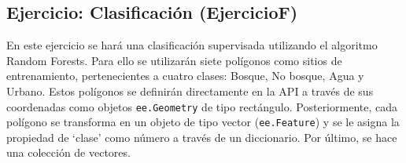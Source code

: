 \documentclass[
  12pt,
  letterpaper,
  twoside]{book}
\begin{document}
\hypertarget{ejercicio-clasificaciuxf3n-ejerciciof}{%
\subsection{Ejercicio: Clasificación (EjercicioF)}\label{ejercicio-clasificaciuxf3n-ejerciciof}}

En este ejercicio se hará una clasificación supervisada utilizando el algoritmo Random Forests. Para ello se utilizarán siete polígonos como sitios de entrenamiento, pertenecientes a cuatro clases: Bosque, No bosque, Agua y Urbano. Estos polígonos se definirán directamente en la API a través de sus coordenadas como objetos \texttt{ee.Geometry} de tipo rectángulo. Posteriormente, cada polígono se transforma en un objeto de tipo vector (\texttt{ee.Feature}) y se le asigna la propiedad de `clase' como número a través de un diccionario. Por último, se hace una colección de vectores.
\end{document}
